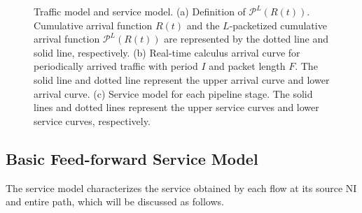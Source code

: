 \documentclass[10pt,journal]{IEEEtran}
\begin{document}
\begin{figure}
  \caption{Traffic model and service model. (a) Definition of $\mathcal{P}^L(R(t))$. Cumulative arrival function $R(t)$ and the $L$-packetized cumulative arrival function $\mathcal{P}^L(R(t))$ are represented by the dotted line and solid line, respectively. (b) Real-time calculus arrival curve for periodically arrived traffic with period $I$ and packet length $F$. The solid line and dotted line represent the upper arrival curve and lower arrival curve. (c) Service model for each pipeline stage. The solid lines and dotted lines represent the upper service curves and lower service curves, respectively.}\label{ac}
\end{figure}

\subsection{Basic Feed-forward Service Model}\label{sm}
The service model characterizes the service obtained by each flow at its source NI and entire path, which will be discussed as follows.
\end{document}
